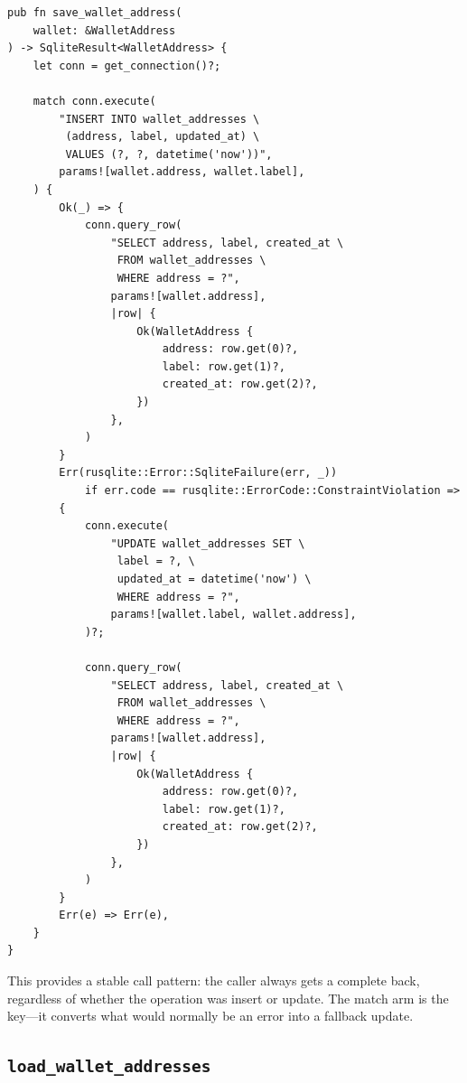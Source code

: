 \begin{listing}[H]
\caption{Insert or update a wallet address}
\label{lst:ch20-save-wallet}
\begin{verbatim}
pub fn save_wallet_address(
    wallet: &WalletAddress
) -> SqliteResult<WalletAddress> {
    let conn = get_connection()?;

    match conn.execute(
        "INSERT INTO wallet_addresses \
         (address, label, updated_at) \
         VALUES (?, ?, datetime('now'))",
        params![wallet.address, wallet.label],
    ) {
        Ok(_) => {
            conn.query_row(
                "SELECT address, label, created_at \
                 FROM wallet_addresses \
                 WHERE address = ?",
                params![wallet.address],
                |row| {
                    Ok(WalletAddress {
                        address: row.get(0)?,
                        label: row.get(1)?,
                        created_at: row.get(2)?,
                    })
                },
            )
        }
        Err(rusqlite::Error::SqliteFailure(err, _))
            if err.code == rusqlite::ErrorCode::ConstraintViolation =>
        {
            conn.execute(
                "UPDATE wallet_addresses SET \
                 label = ?, \
                 updated_at = datetime('now') \
                 WHERE address = ?",
                params![wallet.label, wallet.address],
            )?;

            conn.query_row(
                "SELECT address, label, created_at \
                 FROM wallet_addresses \
                 WHERE address = ?",
                params![wallet.address],
                |row| {
                    Ok(WalletAddress {
                        address: row.get(0)?,
                        label: row.get(1)?,
                        created_at: row.get(2)?,
                    })
                },
            )
        }
        Err(e) => Err(e),
    }
}
\end{verbatim}
\end{listing}

This provides a stable call pattern: the caller always gets a complete  back, regardless of whether the operation was insert or update. The  match arm is the key---it converts what would normally be an error into a fallback update.

\subsection{\texttt{load\_wallet\_addresses}}
\label{sec:load-wallet-addresses}

